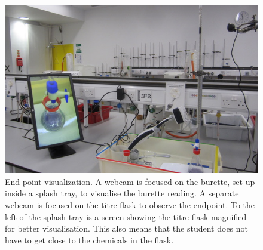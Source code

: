 \documentclass[11.5pt]{sig-alternate} %
\begin{document}
\begin{large}
\begin{figure}[htbp]
    \centering
    \includegraphics[width=\columnwidth]{images/fig9.jpeg}
    \caption{End-point visualization. A webcam is focused on the burette, set-up inside a splash tray, to visualise the burette reading. A separate webcam is focused on the titre flask to observe the endpoint. To the left of the splash tray is a screen showing the titre flask magnified for better visualisation. This also means that the student does not have to get close to the chemicals in the flask.}
    \label{Figure 9}
\end{figure}


\end{large}
\end{document}
